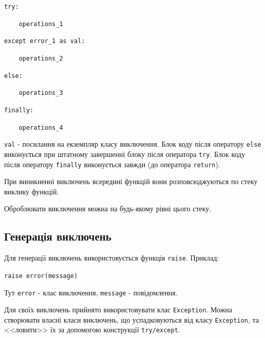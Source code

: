 \begin{frame}
\texttt{try:}

\texttt{~~~~operations\_1}

\texttt{except error\_1 as val:}

\texttt{~~~~operations\_2}

\texttt{else:}

\texttt{~~~~operations\_3}

\texttt{finally:}

\texttt{~~~~operations\_4}

\texttt{val} - посилання на екземпляр класу виключення. Блок коду після оператору \texttt{else} виконується при штатному завершенні блоку після оператора \texttt{try}. Блок коду після оператору \texttt{finally} виконується завжди (до оператора \texttt{return}).
\end{frame}

\begin{frame}
При виникненні виключень всередині функцій вони розповсюджуються по стеку виклику функцій.

Оброблювати виключення можна на будь-якому рівні цього стеку.
\end{frame}

\subsection{Генерація виключень} 
\begin{frame}
Для генерації виключень використовується функція \texttt{raise}. Приклад:

\texttt{raise error(message)}

Тут \texttt{error} - клас виключення, \texttt{message} - повідомлення.

Для своїх виключень прийнято використовувати клас \texttt{Exception}. Можна створювати власні класи виключень, що успадковуються від класу \texttt{Exception}, та <<ловити>> їх за допомогою конструкції \texttt{try/except}.


\end{frame}

